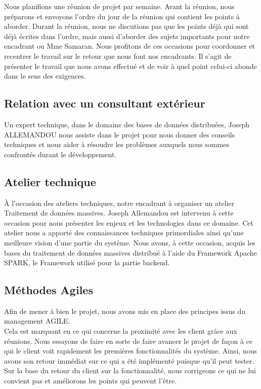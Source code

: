 \documentclass[a4paper]{article}
\begin{document}
Nous planifions une réunion de projet par semaine. Avant la réunion, nous préparons et envoyons
l’ordre du jour de la réunion qui contient les points à aborder. Durant la réunion, nous ne
discutions pas que les points déjà qui sont déjà écrites dans l’ordre, mais aussi d’aborder des
sujets importants pour notre encadrant ou Mme Samaran. Nous profitons de ces occasions pour
coordonner et recentrer le travail sur le retour que nous font nos encadrants. Il s’agit de présenter
le travail que nous avons effectué et de voir à quel point celui-ci abonde dans le sens des
exigences.

\subsection{Relation avec un consultant extérieur}

Un expert technique, dans le domaine des bases de données distribuées, Joseph
ALLEMANDOU nous assiste dans le projet pour nous donner des conseils techniques et nous aider
à résoudre les problèmes auxquels nous sommes confrontés durant le développement.

\subsection{Atelier technique}

À l’occasion des ateliers techniques, notre encadrant à organiser un atelier Traitement de
données massives. Joseph Allemandou est intervenu à cette occasion pour nous présenter les
enjeux et les technologies dans ce domaine. Cet atelier nous a apporté des connaissances
techniques primordiales ainsi qu’une meilleure vision d’une partie du système. Nous avons, à
cette occasion, acquis les bases du traitement de données massives distribué à l’aide du
Framework Apache SPARK, le Framework utilisé pour la partie backend.

\subsection{Méthodes Agiles}

Afin de mener à bien le projet, nous avons mis en place des principes issus du management
AGILE.
\\

Cela est marquant en ce qui concerne la proximité avec les client grâce aux réunions. Nous
essayons de faire en sorte de faire avancer le projet de façon à ce qui le client voit rapidement
les premières fonctionnalités du système. Ainsi, nous avons son retour immédiat sur ce qui a été
implémenté puisque qu’il peut tester. Sur la base du retour du client sur la fonctionnalité, nous
corrigeons ce qui ne lui convient pas et améliorons les points qui peuvent l’être.
\\
\end{document}
